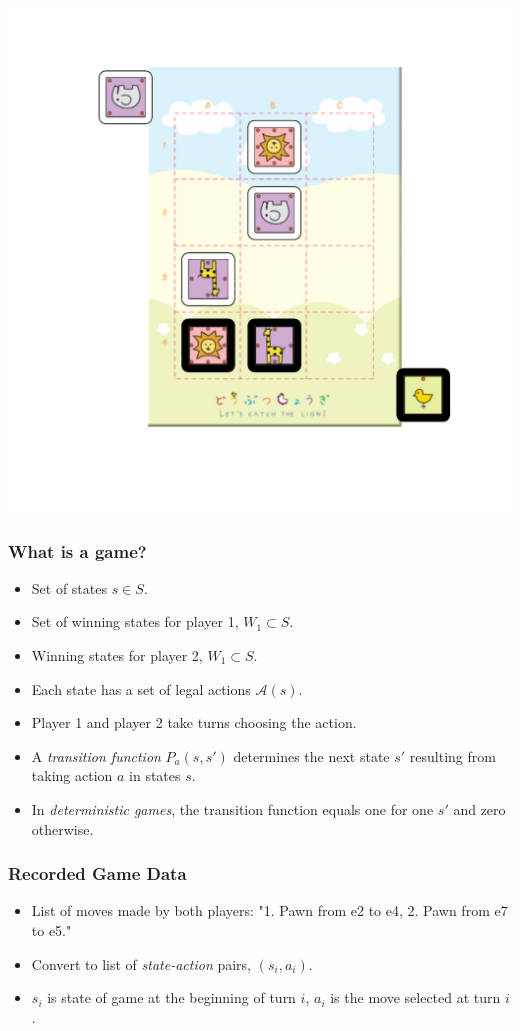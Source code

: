 \documentclass{beamer}
\begin{document}
\begin{frame}
\includegraphics[scale = 0.6, clip=true, trim=1in 1in 0in 0.5in]{example10.pdf}
\end{frame}



\begin{frame}
\frametitle{What is a game?}
\begin{itemize}
\item Set of states $s \in S$.
\item Set of winning states for player 1, $W_1 \subset S$.
\item Winning states for player 2, $W_1 \subset S$.
\item Each state has a set of legal actions $\mathcal{A}(s)$.
\item Player 1 and player 2 take turns choosing the action.
\item A \emph{transition function} $P_a(s, s')$ determines the next state $s'$ resulting from taking action $a$ in states $s$.
\item In \emph{deterministic games}, the transition function equals one for one $s'$ and zero otherwise.
\end{itemize}
\end{frame}

\begin{frame}
\frametitle{Recorded Game Data}
\begin{itemize}
\item List of moves made by both players: "1. Pawn from e2 to e4, 2. Pawn from e7 to e5."
\item Convert to list of \emph{state-action} pairs, $(s_i, a_i)$.
\item $s_i$ is state of game at the beginning of turn $i$, $a_i$ is the move selected at turn $i$.
\end{itemize}
\end{frame}
\end{document}
